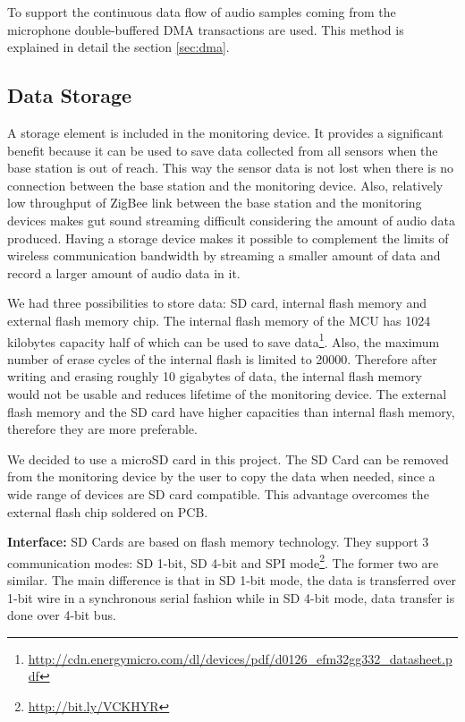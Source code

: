 To support the continuous data flow of audio samples coming from the microphone double-buffered DMA transactions are used. This method is explained in detail the section \ref{sec:dma}.


\subsection{Data Storage}
\label{sec:data_storage}
A storage element is included in the monitoring device. It provides a significant benefit because it can be used to save data collected from all sensors when the base station is out of reach. This way the sensor data is not lost when there is no connection between the base station and the monitoring device. Also, relatively low throughput of ZigBee link between the base station and the monitoring devices makes gut sound streaming difficult considering the amount of audio data produced. Having a storage device makes it possible to complement the limits of wireless communication bandwidth by streaming a smaller amount of data and record a larger amount of audio data in it. 

We had three possibilities to store data: SD card, internal flash memory and external flash memory chip. The internal flash memory of the MCU has 1024 kilobytes capacity half of which can be used to save data\footnote{\url{http://cdn.energymicro.com/dl/devices/pdf/d0126_efm32gg332_datasheet.pdf}}. Also, the maximum number of erase cycles of the internal flash is limited to 20000. Therefore after writing and erasing roughly 10 gigabytes of data, the internal flash memory would not be usable and reduces lifetime of the monitoring device. The external flash memory and the SD card have higher capacities than internal flash memory, therefore they are more preferable. 

We decided to use a microSD card in this project. The SD Card can be removed from the monitoring device by the user to copy the data when needed, since a wide range of devices are SD card compatible. This advantage overcomes the external flash chip soldered on PCB. 

\textbf{Interface:}
SD Cards are based on flash memory technology. They support 3 communication modes: SD 1-bit, SD 4-bit and SPI mode\footnote{\url{http://bit.ly/VCKHYR}}. The former two are similar. The main difference is that in SD 1-bit mode, the data is transferred over 1-bit wire in a synchronous serial fashion while in SD 4-bit mode, data transfer is done over 4-bit bus. 

